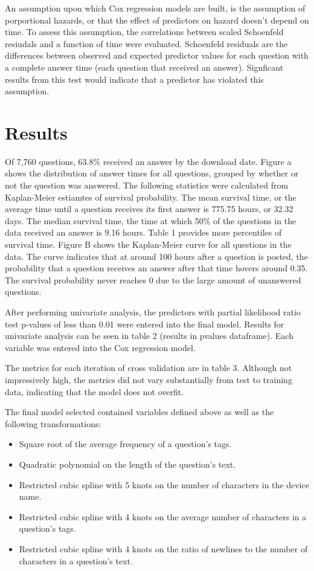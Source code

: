 \documentclass[12pt]{article}
\begin{document}
An assumption upon which Cox regression models are built, is the assumption of porportional hazards, or that the effect of predictors on hazard doesn't depend on time. To assess this assumption, the correlations between scaled Schoenfeld resiudals and a function of time were evaluated. Schoenfeld residuals are the differences between observed and expected predictor values for each question with a complete answer time (each question that received an answer). Signficant results from this test would indicate that a predictor has violated this assumption. 

  
\section{Results} 

  Of 7,760 questions, 63.8\% received an answer by the download date. Figure a shows the distribution of answer times for all questions, grouped by whether or not the question was answered. The following statistics were calculated from Kaplan-Meier estiamtes of survival probability. The mean survival time, or the average time until a question receives its first answer is 775.75 hours, or 32.32 days. The median survival time, the time at which 50\% of the questions in the data received an answer is 9.16 hours. Table 1 provides more percentiles of survival time. Figure B shows the Kaplan-Meier curve for all questions in the data. The curve indicates that at around 100 hours after a question is posted, the probability that a question receives an answer after that time hovers around 0.35. The survival probability never reaches 0 due to the large amount of unanswered questions. 

After performing univariate analysis, the predictors with partial likelihood ratio test p-values of less than 0.01 were entered into the final model. Results for univariate analysis can be seen in table 2 (results in pvalues dataframe). Each variable was entered into the Cox regression model. 

The metrics for each iteration of cross validation are in table 3. Although not impressively high, the metrics did not vary substantially from test to training data, indicating that the model does not overfit.

The final model selected contained variables defined above as well as the following transformations: 
\begin{itemize}
  \item Square root of the average frequency of a question's tags. 
  \item Quadratic polynomial on the length of the question's text. 
  \item Restricted cubic spline with 5 knots on the number of characters in the device name.
  \item Restricted cubic spline with 4 knots on the average number of characters in a question's tags.
  \item Restricted cubic spline with 4 knots on the ratio of newlines to the number of characters in a question's text. 
\end{itemize}
\end{document}
